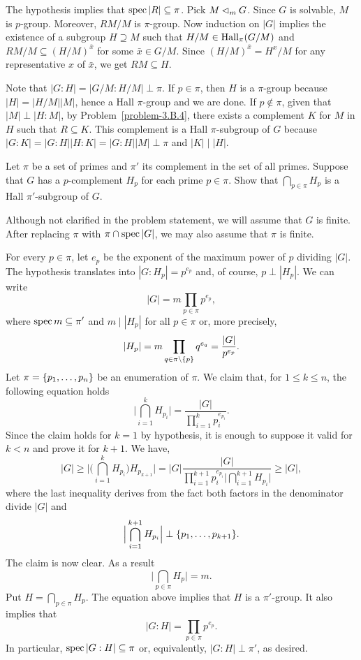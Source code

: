 \begin{solution} The hypothesis implies that $\operatorname{spec}|R|\subseteq\pi$. Pick $M\lhd_mG$. Since $G$ is solvable, $M$ is $p$-group. Moreover, $RM/M$ is $\pi$-group. Now induction on $|G|$ implies the existence of a subgroup $H\supseteq M$ such that $H/M\in{\rm Hall}_\pi(G/M)$ and $RM/M\subseteq(H/M)^{\bar x}$ for some $\bar x\in G/M$. Since $(H/M)^{\bar x}=H^x/M$ for any representative $x$ of $\bar x$, we get $RM\subseteq H$.

Note that $|G:H|=|G/M:H/M|\perp\pi$. If $p\in\pi$, then $H$ is a $\pi$-group because $|H|=|H/M||M|$, hence a Hall $\pi$-group and we are done. If $p\notin\pi$, given that $|M|\perp|H:M|$, by Problem~\ref{problem-3.B.4}, there exists a complement $K$ for $M$ in $H$ such that $R\subseteq K$. This complement is a Hall $\pi$-subgroup of $G$ because $|G:K|=|G:H||H:K|=|G:H||M|\perp\pi$ and $|K|\mid|H|$.  \end{solution}

\begin{probl}
    Let\/ $\pi$ be a set of primes and\/ $\pi'$ its complement in the set of all primes. Suppose that\/ $G$ has a\/ $p$-complement\/ $H_p$ for each prime\/ $p \in\pi$. Show that\/ $\bigcap_{p\in\pi}H_p$
    is a Hall\/ $\pi'$-subgroup of\/ $G$.
\end{probl}

\begin{solution} Although not clarified in the problem statement, we will assume that $G$ is finite. After replacing $\pi$ with $\pi\cap\operatorname{spec}|G|$, we may also assume that $\pi$ is finite.

For every $p\in\pi$, let $e_p$ be the exponent of the maximum power of $p$ dividing $|G|$. The hypothesis translates into $|G:H_p|=p^{e_p}$ and, of course, $p\perp|H_p|$. We can write
$$
    |G|=m\prod_{p\in\pi}p^{e_p},
$$
where $\operatorname{spec}m\subseteq\pi'$ and $m\mid|H_p|$ for all $p\in\pi$ or, more precisely,
$$
    |H_p| = m\prod_{q\in\pi\setminus\{p\}}q^{e_q}=\frac{|G|}{p^{e_p}}.
$$
Let $\pi=\{p_1,\dots,p_n\}$ be an enumeration of $\pi$. We claim that, for $1\le k\le n$, the following equation holds
$$
    \Big|\bigcap_{i=1}^k H_{p_i}\Big| = \frac{|G|}{\prod_{i=1}^kp_i^{e_{p_i}}}.
$$
Since the claim holds for $k=1$ by hypothesis, it is enough to suppose it valid for $k<n$ and prove it for $k+1$. We have,
\begin{equation}\label{eq16}
    |G|\ge \Big|\Big(\bigcap_{i=1}^kH_{p_i}\Big)H_{p_{k+1}}\Big|
        = |G|\frac{|G|}{\prod_{i=1}^{k+1}p_i^{e_{p_i}}\Big|\bigcap_{i=1}^{k+1}H_{p_i}\Big|}
        \ge |G|,
\end{equation}
where the last inequality derives from the fact both factors in the denominator divide $|G|$ and
$$
    \Big|\bigcap_{i=1}^{k+1}H_{p_i}\Big| \perp\{p_1,\dots,p_{k+1}\}.
$$
The claim is now clear. As a result
$$
    \Big|\bigcap_{p\in\pi}H_p\Big| = m.    
$$
Put $H=\bigcap_{p\in\pi}H_p$. The equation above implies that $H$ is a $\pi'$-group. It also implies that
\begin{equation}\label{eq17}
    |G:H|=\prod_{p\in\pi}p^{e_p}.
\end{equation}
In particular, $\operatorname{spec}|G:H|\subseteq\pi$ or, equivalently, $|G:H|\perp\pi'$, as desired.  \end{solution}

